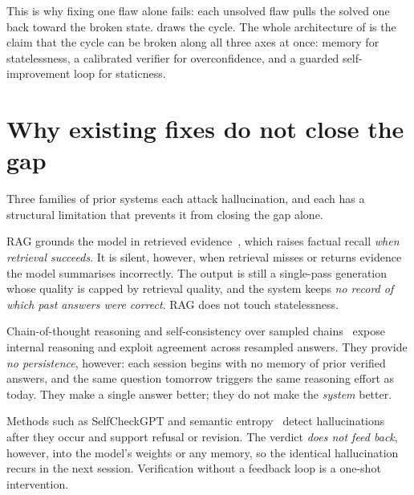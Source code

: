 This is why fixing one flaw alone fails: each unsolved flaw pulls the solved one
back toward the broken state.  draws the cycle. The
whole architecture of \caem{} is the claim that the cycle can be broken along
all three axes at once: memory for statelessness, a calibrated verifier for
overconfidence, and a guarded self-improvement loop for staticness.

\section{Why existing fixes do not close the gap}
\label{sec:prior-fail}

Three families of prior systems each attack hallucination, and each has a
structural limitation that prevents it from closing the gap alone.

\begin{description}[leftmargin=0pt, labelsep=0.5em, style=nextline]
  \item[Retrieval-augmented generation (RAG).] RAG grounds the model in
  retrieved evidence~\cite{NEURIPS2020_6b493230}, which raises factual recall
  \emph{when retrieval succeeds}. It is silent, however, when retrieval misses
  or returns evidence the model summarises incorrectly. The output is still a
  single-pass generation whose quality is capped by retrieval quality, and the
  system keeps \emph{no record of which past answers were correct}. RAG does not
  touch statelessness.

  \item[Prompting interventions.] Chain-of-thought reasoning and
  self-consistency over sampled chains~\cite{wei2022chain, wang2023selfconsistency}
  expose internal reasoning and exploit agreement across resampled answers. They
  provide \emph{no persistence}, however: each session begins with no memory of
  prior verified answers, and the same question tomorrow triggers the same
  reasoning effort as today. They make a single answer better; they do not make
  the \emph{system} better.

  \item[Post-generation verification.] Methods such as SelfCheckGPT and semantic
  entropy~\cite{manakul-etal-2023-selfcheckgpt, farquhar2024semantic} detect
  hallucinations after they occur and support refusal or revision. The verdict
  \emph{does not feed back}, however, into the model's weights or any memory, so
  the identical hallucination recurs in the next session. Verification without a
  feedback loop is a one-shot intervention.
\end{description}

